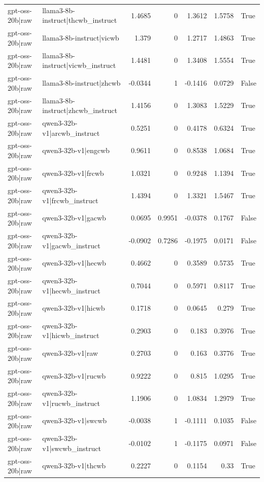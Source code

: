 \begin{table}
\begin{tabular}{l l r r r r l}
gpt-oss-20b|raw & llama3-8b-instruct|thcwb_instruct & 1.4685 & 0 & 1.3612 & 1.5758 & True \\
gpt-oss-20b|raw & llama3-8b-instruct|vicwb & 1.379 & 0 & 1.2717 & 1.4863 & True \\
gpt-oss-20b|raw & llama3-8b-instruct|vicwb_instruct & 1.4481 & 0 & 1.3408 & 1.5554 & True \\
gpt-oss-20b|raw & llama3-8b-instruct|zhcwb & -0.0344 & 1 & -0.1416 & 0.0729 & False \\
gpt-oss-20b|raw & llama3-8b-instruct|zhcwb_instruct & 1.4156 & 0 & 1.3083 & 1.5229 & True \\
gpt-oss-20b|raw & qwen3-32b-v1|arcwb_instruct & 0.5251 & 0 & 0.4178 & 0.6324 & True \\
gpt-oss-20b|raw & qwen3-32b-v1|engcwb & 0.9611 & 0 & 0.8538 & 1.0684 & True \\
gpt-oss-20b|raw & qwen3-32b-v1|frcwb & 1.0321 & 0 & 0.9248 & 1.1394 & True \\
gpt-oss-20b|raw & qwen3-32b-v1|frcwb_instruct & 1.4394 & 0 & 1.3321 & 1.5467 & True \\
gpt-oss-20b|raw & qwen3-32b-v1|gacwb & 0.0695 & 0.9951 & -0.0378 & 0.1767 & False \\
gpt-oss-20b|raw & qwen3-32b-v1|gacwb_instruct & -0.0902 & 0.7286 & -0.1975 & 0.0171 & False \\
gpt-oss-20b|raw & qwen3-32b-v1|hecwb & 0.4662 & 0 & 0.3589 & 0.5735 & True \\
gpt-oss-20b|raw & qwen3-32b-v1|hecwb_instruct & 0.7044 & 0 & 0.5971 & 0.8117 & True \\
gpt-oss-20b|raw & qwen3-32b-v1|hicwb & 0.1718 & 0 & 0.0645 & 0.279 & True \\
gpt-oss-20b|raw & qwen3-32b-v1|hicwb_instruct & 0.2903 & 0 & 0.183 & 0.3976 & True \\
gpt-oss-20b|raw & qwen3-32b-v1|raw & 0.2703 & 0 & 0.163 & 0.3776 & True \\
gpt-oss-20b|raw & qwen3-32b-v1|rucwb & 0.9222 & 0 & 0.815 & 1.0295 & True \\
gpt-oss-20b|raw & qwen3-32b-v1|rucwb_instruct & 1.1906 & 0 & 1.0834 & 1.2979 & True \\
gpt-oss-20b|raw & qwen3-32b-v1|swcwb & -0.0038 & 1 & -0.1111 & 0.1035 & False \\
gpt-oss-20b|raw & qwen3-32b-v1|swcwb_instruct & -0.0102 & 1 & -0.1175 & 0.0971 & False \\
gpt-oss-20b|raw & qwen3-32b-v1|thcwb & 0.2227 & 0 & 0.1154 & 0.33 & True \\

\end{tabular}
\end{table}
